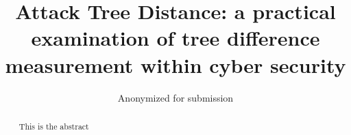 \documentclass[format=sigconf]{acmart}
\begin{document}
\title{Attack Tree Distance: a practical examination of tree difference measurement within cyber security}

\iffalse{
    \author{Nathan D. Schiele}
    \orcid{0000-0003-1186-1503}
    \affiliation{\institution{Leiden University}
        \city{Leiden}
        \country{The Netherlands}}
    \email{n.d.schiele@liacs.leidenuniv.nl}


    \author{Olga Gadyatskaya}
    \orcid{0000-0002-3760-9165}
    \affiliation{\institution{Leiden University}
        \city{Leiden}
        \country{The Netherlands}}
    \email{o.gadyatskaya@liacs.leidenuniv.nl}
}\fi
\author{Anonymized for submission}









\begin{abstract}

    This is the abstract
\end{abstract}

\maketitle              %












% 
% 
% 
% 




\cite{*}



{}




\appendix


% 
\end{document}
